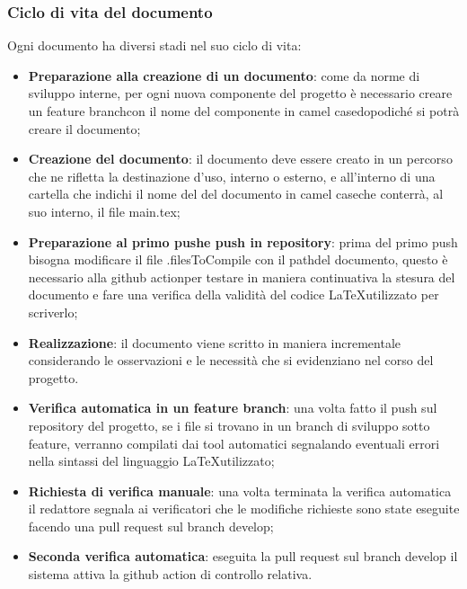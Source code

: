   \subsubsection{Ciclo di vita del documento}
  Ogni documento ha diversi stadi nel suo ciclo di vita:
  \begin{itemize}
    \item \textbf{Preparazione alla creazione di un documento}: come da norme di
    sviluppo interne, per ogni nuova componente del progetto \`e necessario creare un
    feature branch\glo con il nome del componente in camel case\glo dopodich\'e
    si potr\`a creare il documento;

    \item \textbf{Creazione del documento}: il documento deve essere creato in un
    percorso che ne rifletta la destinazione d'uso, interno o esterno, e
    all'interno di una cartella che indichi il nome del del documento in
    camel case\glo che conterr\`a, al suo interno, il file main.tex;

    \item \textbf{Preparazione al primo push\glo e push in repository\glo}: prima del primo
     push bisogna modificare il file .filesToCompile con il path\glo del documento,
     questo \`e necessario alla github action\glo per testare in maniera continuativa
     la stesura del documento e fare una verifica della validit\`a del codice
     \LaTeX \space utilizzato per scriverlo;

    \item \textbf{Realizzazione}: il documento viene scritto in maniera incrementale
    considerando le osservazioni e le necessit\`a che si evidenziano nel corso del
    progetto.

    \item \textbf{Verifica automatica in un feature branch}: una volta fatto il push
    sul repository del progetto, se i file si trovano in un branch di sviluppo
    sotto feature, verranno compilati dai tool automatici segnalando eventuali errori
    nella sintassi del linguaggio \LaTeX \space utilizzato;

    \item \textbf{Richiesta di verifica manuale}: una volta terminata la verifica
    automatica il redattore segnala ai verificatori che le modifiche richieste
    sono state eseguite facendo una pull request sul branch develop;

    \item \textbf{Seconda verifica automatica}: eseguita la pull request sul branch
    develop il sistema attiva la github action di controllo relativa.


\end{itemize}
